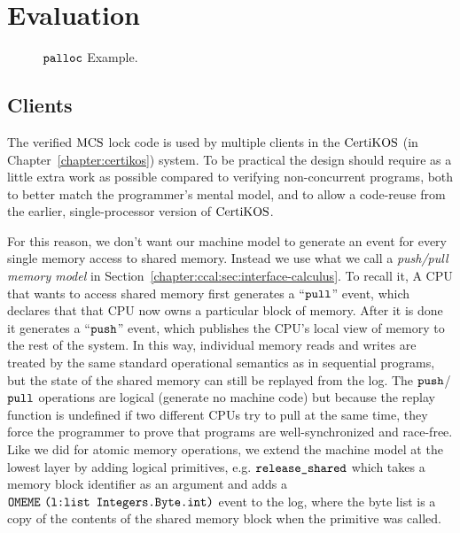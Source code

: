 
\section{Evaluation}
\label{chapter:mcslock:sec:evaluation}

\begin{figure}
\begin{minipage}{\linewidth}
\noindent
\begin{multicols}{2}


\end{multicols}
\end{minipage}
\caption{${\mathrm{\texttt{palloc}}}$ Example.}
\label{fig:chapter:mcslock:palloc-example}
\end{figure}

\subsection{Clients}

The verified $\mathrm{MCS}$ lock code is used by multiple clients in the $\mathrm{CertiKOS}$ (in Chapter~\ref{chapter:certikos})
system. To be practical the design should require as a little extra work
as possible compared to verifying non-concurrent programs, both to
better match the programmer's mental model, and to allow a code-reuse
from the earlier, single-processor version of $\mathrm{CertiKOS}$.

For this reason, we don't want our machine model to generate an event
for every single memory access to shared memory. Instead we use what
we call a \emph{push/pull memory model} in Section~\ref{chapter:ccal:sec:interface-calculus}.
To recall it,
 A CPU that wants to access shared memory first generates a ``${\mathrm{\texttt{pull}}}$''
event, which declares that that CPU now owns a particular block of
memory. After it is done it generates a ``${\mathrm{\texttt{push}}}$'' event, which
publishes the CPU's local view of memory to the rest of the system. In
this way, individual memory reads and writes are treated by the same
standard operational semantics as in sequential programs, but the
state of the shared memory can still be replayed from the log.  The
${\mathrm{\texttt{push}}}$/${\mathrm{\texttt{pull}}}$ operations are logical (generate no machine code) but
because the replay function is undefined if two different CPUs try to
pull at the same time, they force the programmer to prove that
programs are well-synchronized and race-free. Like we did for atomic
memory operations, we extend the machine model at the lowest layer by
adding logical primitives, e.g. ${\mathrm{\texttt{release\_shared}}}$ which takes a
memory block identifier as an argument and adds a
${\mathrm{\texttt{OMEME}}}~{{\mathrm{\texttt{(l:list Integers.Byte.int)}}}}$ event to the log, where the byte list is a
copy of the contents of the shared memory block when the primitive was
called.

